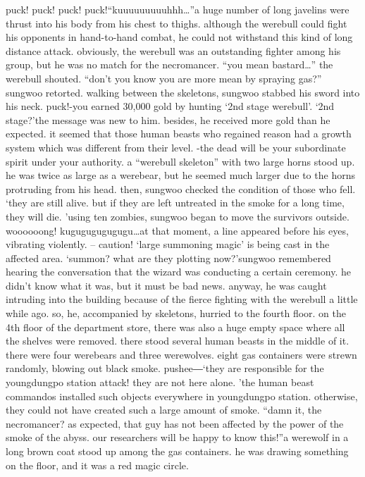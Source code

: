 puck! puck! puck! puck!“kuuuuuuuuuhhh…”a huge number of long javelins were thrust into his body from his chest to thighs.
 although the werebull could fight his opponents in hand-to-hand combat, he could not withstand this kind of long distance attack.
obviously, the werebull was an outstanding fighter among his group, but he was no match for the necromancer.
“you mean bastard…” the werebull shouted.
“don’t you know you are more mean by spraying gas?” sungwoo retorted.
walking between the skeletons, sungwoo stabbed his sword into his neck.
puck!-you earned 30,000 gold by hunting ‘2nd stage werebull’.
‘2nd stage?’the message was new to him.
 besides, he received more gold than he expected.
 it seemed that those human beasts who regained reason had a growth system which was different from their level.
-the dead will be your subordinate spirit under your authority.
a “werebull skeleton” with two large horns stood up.
 he was twice as large as a werebear, but he seemed much larger due to the horns protruding from his head.
then, sungwoo checked the condition of those who fell.
‘they are still alive.
 but if they are left untreated in the smoke for a long time, they will die.
’using ten zombies, sungwoo began to move the survivors outside.
woooooong! kugugugugugugu…at that moment, a line appeared before his eyes, vibrating violently.
– caution! ‘large summoning magic’ is being cast in the affected area.
‘summon? what are they plotting now?’sungwoo remembered hearing the conversation that the wizard was conducting a certain ceremony.
 he didn’t know what it was, but it must be bad news.
anyway, he was caught intruding into the building because of the fierce fighting with the werebull a little while ago.
 so, he, accompanied by skeletons, hurried to the fourth floor.
on the 4th floor of the department store, there was also a huge empty space where all the shelves were removed.
 there stood several human beasts in the middle of it.
there were four werebears and three werewolves.
 eight gas containers were strewn randomly, blowing out black smoke.
pushee―‘they are responsible for the youngdungpo station attack! they are not here alone.
’the human beast commandos installed such objects everywhere in youngdungpo station.
 otherwise, they could not have created such a large amount of smoke.
“damn it, the necromancer? as expected, that guy has not been affected by the power of the smoke of the abyss.
 our researchers will be happy to know this!”a werewolf in a long brown coat stood up among the gas containers.
 he was drawing something on the floor, and it was a red magic circle.
